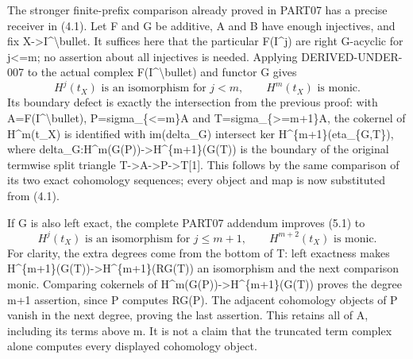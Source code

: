 The stronger finite-prefix comparison already proved in PART07 has a precise receiver in (4.1)\allowbreak{}. Let F and G be additive,\allowbreak{} A and B have enough injectives,\allowbreak{} and fix X\allowbreak{}->I\textasciicircum{}\textbackslash{}bullet. It suffices here that the particular F(I\textasciicircum{}j)\allowbreak{} are right G-acyclic for j<\allowbreak{}=m; no assertion about all injectives is needed. Applying DERIVED-UNDER-007 to the actual complex F(I\textasciicircum{}\textbackslash{}bullet)\allowbreak{} and functor G gives \[
 H^j(t_X)\text{ is an isomorphism for }j<m,\qquad
 H^m(t_X)\text{ is monic}.                                    \tag{5.1}
\] Its boundary defect is exactly the intersection from the previous proof:\allowbreak{} with A\allowbreak{}=F(I\textasciicircum{}\textbackslash{}bullet)\allowbreak{},\allowbreak{} P\allowbreak{}=sigma\_\allowbreak{}\{<\allowbreak{}=m\}A and T\allowbreak{}=sigma\_\allowbreak{}\{>\allowbreak{}=m\allowbreak{}+1\}A,\allowbreak{} the cokernel of H\textasciicircum{}m(t\_\allowbreak{}X)\allowbreak{} is identified with im(delta\_\allowbreak{}G)\allowbreak{} intersect ker H\textasciicircum{}\{m\allowbreak{}+1\}(eta\_\allowbreak{}\{G,\allowbreak{}T\})\allowbreak{},\allowbreak{} where delta\_\allowbreak{}G:\allowbreak{}H\textasciicircum{}m(G(P)\allowbreak{})\allowbreak{}\allowbreak{}->H\textasciicircum{}\{m\allowbreak{}+1\}(G(T)\allowbreak{})\allowbreak{} is the boundary of the original termwise split triangle T\allowbreak{}->A\allowbreak{}->P\allowbreak{}->T[1]\allowbreak{}. This follows by the same comparison of its two exact cohomology sequences; every object and map is now substituted from (4.1)\allowbreak{}.

If G is also left exact,\allowbreak{} the complete PART07 addendum improves (5.1)\allowbreak{} to \[
 H^j(t_X)\text{ is an isomorphism for }j\le m+1,\qquad
 H^{m+2}(t_X)\text{ is monic}.                                \tag{5.2}
\] For clarity,\allowbreak{} the extra degrees come from the bottom of T:\allowbreak{} left exactness makes H\textasciicircum{}\{m\allowbreak{}+1\}(G(T)\allowbreak{})\allowbreak{}\allowbreak{}->H\textasciicircum{}\{m\allowbreak{}+1\}(RG(T)\allowbreak{})\allowbreak{} an isomorphism and the next comparison monic. Comparing cokernels of H\textasciicircum{}m(G(P)\allowbreak{})\allowbreak{}\allowbreak{}->H\textasciicircum{}\{m\allowbreak{}+1\}(G(T)\allowbreak{})\allowbreak{} proves the degree m\allowbreak{}+1 assertion,\allowbreak{} since P computes RG(P)\allowbreak{}. The adjacent cohomology objects of P vanish in the next degree,\allowbreak{} proving the last assertion. This retains all of A,\allowbreak{} including its terms above m. It is not a claim that the truncated term complex alone computes every displayed cohomology object.

